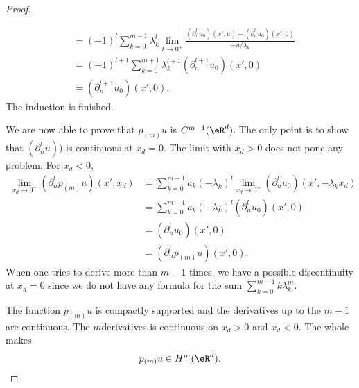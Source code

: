 \begin{proof}
\begin{subproof}
\begin{subequations}
\begin{align}
                    &=(-1)^l\sum_{k=0}^{m-1}\lambda_k^l\lim_{t\to 0^+} \frac{    (\partial_n^lu_0)(x',u)- (\partial_n^lu_0)(x',0)   }{ -u/\lambda_k }\\
                    &=(-1)^{l+1}\sum_{k=0}^{m+1}\lambda_k^{l+1}(\partial_n^{l+1}u_0)(x',0)\\
                    &=(\partial^{l+1}_nu_0)(x',0).
                \end{align}
            \end{subequations}
            The induction is finished.
    \end{subproof}
    We are now able to prove that \( p_{(m)}u\) is \( C^{m-1}(\eR^d)\). The only point is to show that \( (\partial^l_nu))\) is continuous at \( x_d=0\). The limit with \( x_d>0\) does not pone any problem. For \( x_d<0\),
    \begin{subequations}
        \begin{align}
            \lim_{x_d\to 0^-}(\partial_n^lp_{(m)}u)(x',x_d)&=\sum_{k=0}^{m-1}a_k(-\lambda_k)^l\lim_{x_d\to 0^-}(\partial_n^lu_0)(x',-\lambda_kx_d)\\
            &=\sum_{k=0}^{m-1}a_k(-\lambda_k)^l(\partial_n^lu_0)(x',0)\\
            &=(\partial_n^lu_0)(x',0)\\
            &=(\partial^l_np_{(m)}u)(x',0).
        \end{align}
    \end{subequations}
    When one tries to derive more than \( m-1\) times, we have a possible discontinuity at \( x_d=0\) since we do not have any formula for the sum \( \sum_{k=0}^{m-1}k\lambda_k^m\).

    The function \(p_{(m)}u\) is compactly supported and the derivatives up to the \( m-1\)\ieme are continuous. The \( m\)\ieme derivatives is continuous on \( x_d>0\) and \( x_d<0\). The whole makes
    \begin{equation}
        p_{(m)}u\in H^m(\eR^d).
    \end{equation}
    

\end{proof}

